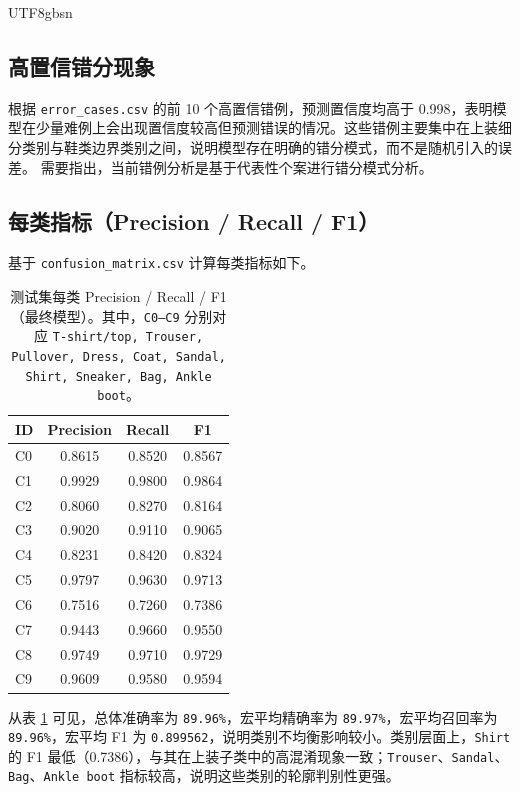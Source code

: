 \documentclass[11pt]{article}
\begin{document}
\begin{CJK*}{UTF8}{gbsn}
\subsection{高置信错分现象}
根据 \texttt{error\_cases.csv} 的前 10 个高置信错例，预测置信度均高于 0.998，表明模型在少量难例上会出现置信度较高但预测错误的情况。这些错例主要集中在上装细分类别与鞋类边界类别之间，说明模型存在明确的错分模式，而不是随机引入的误差。
需要指出，当前错例分析是基于代表性个案进行错分模式分析。

\subsection{每类指标（Precision / Recall / F1）}
基于 \texttt{confusion\_matrix.csv} 计算每类指标如下。

\begin{table}[H]
\centering
\small
\setlength{\tabcolsep}{4pt}
\begin{tabular}{lccc}
\toprule
ID & Precision & Recall & F1 \\
\midrule
C0 & 0.8615 & 0.8520 & 0.8567 \\
C1 & 0.9929 & 0.9800 & 0.9864 \\
C2 & 0.8060 & 0.8270 & 0.8164 \\
C3 & 0.9020 & 0.9110 & 0.9065 \\
C4 & 0.8231 & 0.8420 & 0.8324 \\
C5 & 0.9797 & 0.9630 & 0.9713 \\
C6 & 0.7516 & 0.7260 & 0.7386 \\
C7 & 0.9443 & 0.9660 & 0.9550 \\
C8 & 0.9749 & 0.9710 & 0.9729 \\
C9 & 0.9609 & 0.9580 & 0.9594 \\
\bottomrule
\end{tabular}
\normalsize
\caption{测试集每类 Precision / Recall / F1（最终模型）。其中，\texttt{C0--C9} 分别对应 \texttt{T-shirt/top, Trouser, Pullover, Dress, Coat, Sandal, Shirt, Sneaker, Bag, Ankle boot}。}
\label{tab:per-class-prf}
\end{table}
从表 \ref{tab:per-class-prf} 可见，总体准确率为 \texttt{89.96\%}，宏平均精确率为 \texttt{89.97\%}，宏平均召回率为 \texttt{89.96\%}，宏平均 F1 为 \texttt{0.899562}，说明类别不均衡影响较小。类别层面上，\texttt{Shirt} 的 F1 最低（0.7386），与其在上装子类中的高混淆现象一致；\texttt{Trouser}、\texttt{Sandal}、\texttt{Bag}、\texttt{Ankle boot} 指标较高，说明这些类别的轮廓判别性更强。

\FloatBarrier
{}

\end{CJK*}
\end{document}
